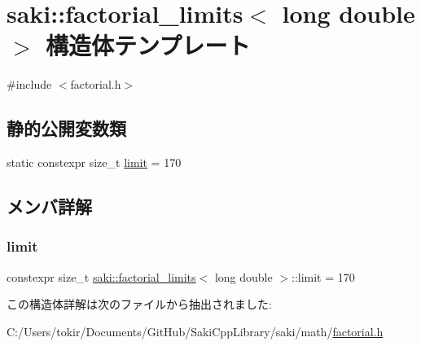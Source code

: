 \hypertarget{structsaki_1_1factorial__limits_3_01long_01double_01_4}{}\section{saki\+:\+:factorial\+\_\+limits$<$ long double $>$ 構造体テンプレート}
\label{structsaki_1_1factorial__limits_3_01long_01double_01_4}


{\ttfamily \#include $<$factorial.\+h$>$}

\subsection*{静的公開変数類}
\begin{DoxyCompactItemize}
\item 
static constexpr size\+\_\+t \mbox{\hyperlink{structsaki_1_1factorial__limits_3_01long_01double_01_4_a7b3f995098451f04c6cb8b6626fc9144}{limit}} = 170
\end{DoxyCompactItemize}


\subsection{メンバ詳解}
\mbox{\label{structsaki_1_1factorial__limits_3_01long_01double_01_4_a7b3f995098451f04c6cb8b6626fc9144}} 
\subsubsection{\texorpdfstring{limit}{limit}}
{\footnotesize\ttfamily constexpr size\+\_\+t \mbox{\hyperlink{structsaki_1_1factorial__limits}{saki\+::factorial\+\_\+limits}}$<$ long double $>$\+::limit = 170\hspace{0.3cm}{\ttfamily [static]}}



この構造体詳解は次のファイルから抽出されました\+:\begin{DoxyCompactItemize}
\item 
C\+:/\+Users/tokir/\+Documents/\+Git\+Hub/\+Saki\+Cpp\+Library/saki/math/\mbox{\hyperlink{factorial_8h}{factorial.\+h}}\end{DoxyCompactItemize}
